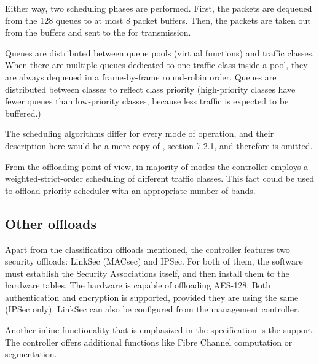 Either way, two scheduling phases are performed. First, the packets are
dequeued from the 128 queues to at most 8 packet buffers. Then, the packets are
taken out from the buffers and sent to the  for transmission.

Queues are distributed between queue pools (virtual functions) and traffic
classes. When there are multiple queues dedicated to one traffic class inside
a pool, they are always dequeued in a frame-by-frame round-robin order. Queues
are distributed between classes to reflect class priority 
(high-priority classes have fewer queues than low-priority classes, because less
traffic is expected to be buffered.)

The scheduling algorithms differ for every mode of operation, and their
description here would be a mere copy of \cite{82599}, section 7.2.1, and
therefore is omitted.

From the offloading point of view, in majority of modes the controller employs
a weighted-strict-order scheduling of different traffic classes. This fact
could be used to offload priority scheduler with an appropriate number of bands.

\subsection{Other offloads}

Apart from the classification offloads mentioned, the controller features two
security offloads: LinkSec (MACsec) and IPSec. For both of them, the software
must establish the Security Associations itself, and then install them to the
hardware tables. The hardware is capable of offloading AES-128. Both
authentication and encryption is supported, provided they are using the same
 (IPSec only). LinkSec can also be configured from the management
controller. 

Another inline functionality that is emphasized in the specification is the
 support. The controller offers additional functions like Fibre
Channel  computation or  segmentation. 
